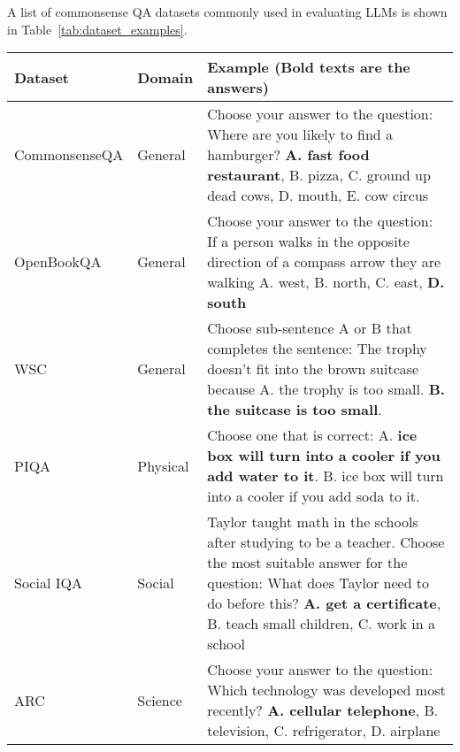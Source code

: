 A list of commonsense QA datasets commonly used in evaluating LLMs is shown in Table~\ref{tab:dataset_examples}.
\begin{table}[h!]
	\small
	\centering
	\begin{tabularx}{\textwidth}{|l|l|X|}
		\hline
		Dataset       & Domain       & Example (Bold texts are the answers)                                                                                                                                                                                                                                     \\
		\hline
		CommonsenseQA & General      & Choose your answer to the question: Where are you likely to find a hamburger? \textbf{A. fast food restaurant}, B. pizza, C. ground up dead cows, D. mouth, E. cow circus                                                                                                \\
		\hline
		OpenBookQA    & General      & Choose your answer to the question: If a person walks in the opposite direction of a compass arrow they are walking A. west, B. north, C. east, \textbf{D. south}                                                                                                        \\
		\hline
		WSC           & General      & Choose sub-sentence A or B that completes the sentence: The trophy doesn't fit into the brown suitcase because A. the trophy is too small. \textbf{B. the suitcase is too small}.                                                                                        \\
		\hline
		PIQA          & Physical     & Choose one that is correct: A. \textbf{ice box will turn into a cooler if you add water to it}. B. ice box will turn into a cooler if you add soda to it.                                                                                                                \\
		\hline
		Social IQA    & Social       & Taylor taught math in the schools after studying to be a teacher. Choose the most suitable answer for the question: What does Taylor need to do before this? \textbf{A. get a certificate}, B. teach small children, C. work in a school                                 \\
		\hline
		ARC           & Science      & Choose your answer to the question: Which technology was developed most recently? \textbf{A. cellular telephone}, B. television, C. refrigerator, D. airplane                                                                                                            \\

\end{tabularx}
\end{table}
